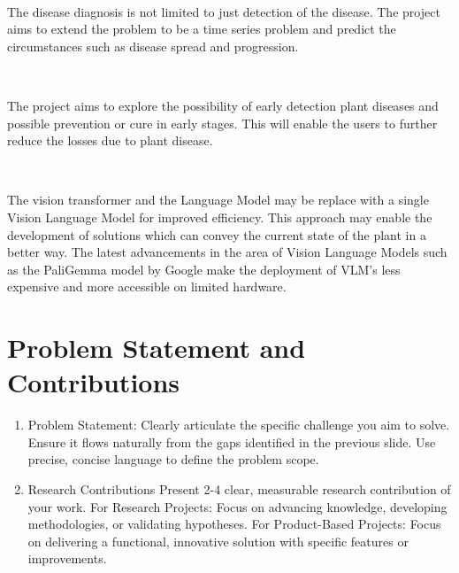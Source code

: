 \

The disease diagnosis is not limited to just detection of the disease. The project aims to extend the problem to be a time series problem and predict the circumstances such as disease spread and progression.

\

The project aims to explore the possibility of early detection plant diseases and possible prevention or cure in early stages. This will enable the users to further reduce the losses due to plant disease.

\

The vision transformer and the Language Model may be replace with a single Vision Language Model for improved efficiency. This approach may enable the development of solutions which can convey the current state of the plant in a better way. The latest advancements in the area of Vision Language Models such as the PaliGemma model by Google make the deployment of VLM's less expensive and more accessible on limited hardware.



\section{Problem Statement and Contributions}

\begin{enumerate}
    \item Problem Statement: Clearly articulate the specific challenge you aim to solve. Ensure it flows naturally from the gaps identified in the previous slide. Use precise, concise language to define the problem scope.
    \item  Research Contributions Present 2-4 clear, measurable research contribution of your work. For Research Projects: Focus on advancing knowledge, developing methodologies, or validating hypotheses. For Product-Based Projects: Focus on delivering a functional, innovative solution with specific features or improvements.
\end{enumerate}